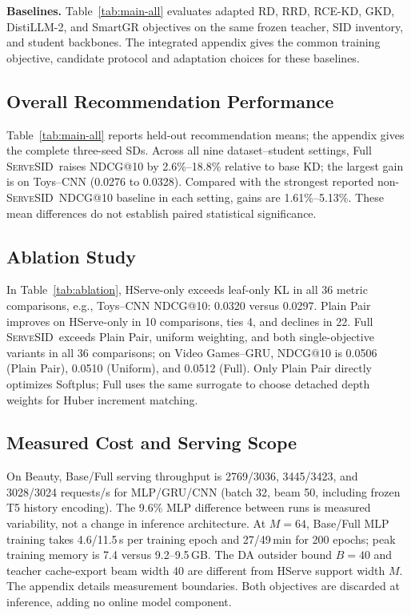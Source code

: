 \documentclass[sigconf, anonymous, review]{acmart}
\newcommand{\method}{\textsc{ServeSID}}
\begin{document}
\textbf{Baselines.} Table~\ref{tab:main-all} evaluates adapted
RD, RRD, RCE-KD, GKD, DistiLLM-2, and SmartGR objectives on
the same frozen teacher, SID inventory, and student backbones.
The integrated appendix gives the common training objective,
candidate protocol and adaptation choices for these baselines.

\subsection{Overall Recommendation Performance}
\label{sec:exp-results}

Table~\ref{tab:main-all} reports held-out recommendation means;
the appendix gives the complete three-seed SDs.
Across all nine dataset--student settings, Full \method\ raises
NDCG@10 by 2.6\%--18.8\% relative to base KD; the largest
gain is on Toys--CNN (0.0276 to 0.0328). Compared with the
strongest reported non-\method\ NDCG@10 baseline in each
setting, gains are 1.61\%--5.13\%. These mean differences
do not establish paired statistical significance.

\subsection{Ablation Study}
\label{sec:exp-ablation}

In Table~\ref{tab:ablation}, HServe-only exceeds leaf-only
KL in all 36 metric comparisons, e.g., Toys--CNN NDCG@10:
0.0320 versus 0.0297. Plain Pair improves on HServe-only
in 10 comparisons, ties 4, and declines in 22.
Full \method\ exceeds Plain Pair, uniform weighting, and
both single-objective variants in all 36 comparisons;
on Video Games--GRU, NDCG@10 is 0.0506 (Plain Pair),
0.0510 (Uniform), and 0.0512 (Full).
Only Plain Pair directly optimizes Softplus; Full uses
the same surrogate to choose detached depth weights
for Huber increment matching.

\subsection{Measured Cost and Serving Scope}
\label{sec:exp-cost}

On Beauty, Base/Full serving throughput is 2769/3036,
3445/3423, and 3028/3024 requests/s for MLP/GRU/CNN
(batch 32, beam 50, including frozen T5 history encoding).
The 9.6\% MLP difference between runs is measured variability,
not a change in inference architecture.
At $M=64$, Base/Full MLP training takes 4.6/11.5\,s
per training epoch and 27/49\,min for 200 epochs;
peak training memory is 7.4 versus 9.2--9.5\,GB.
The DA outsider bound $B=40$ and teacher cache-export beam
width 40 are different from HServe support width $M$.
The appendix details measurement boundaries. Both objectives
are discarded at inference, adding no online model component.
\end{document}
